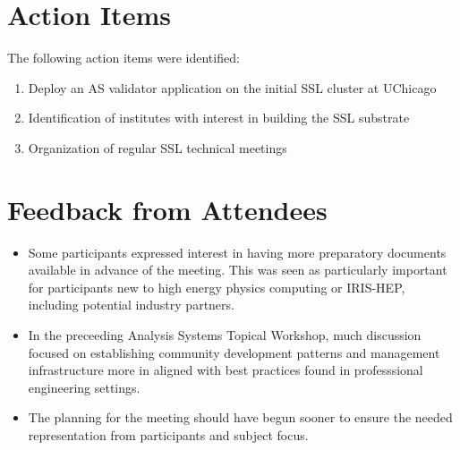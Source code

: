 \documentclass[11pt,letterpaper,fleqn]{article}
\begin{document}


\section{Action Items}
\vspace{0.2cm}
The following action items were identified:
\begin{enumerate}
  \item Deploy an AS validator application on the initial SSL cluster at UChicago
  \item Identification of institutes with interest in building the SSL substrate
  \item Organization of regular SSL technical meetings
\end{enumerate}

\section{Feedback from Attendees}
\vspace{0.2cm}
\begin{itemize}
  \item Some participants expressed interest in having more preparatory documents available in advance of the meeting.  This was seen as particularly important for participants new to high energy physics computing or IRIS-HEP, including potential industry partners.
  \item In the preceeding Analysis Systems Topical Workshop, much discussion focused on establishing community development patterns and management infrastructure more in aligned with best practices found in professsional engineering settings.
  \item The planning for the meeting should have begun sooner to ensure the needed representation from participants and subject focus.
\end{itemize}
\end{document}
